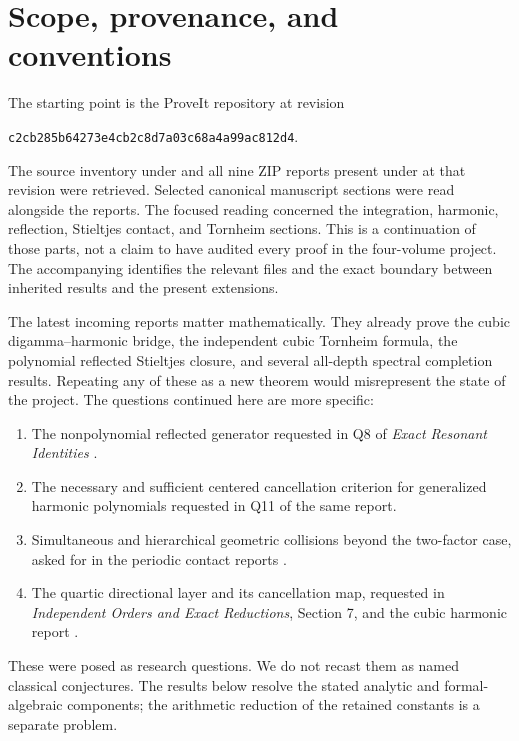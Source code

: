 \section{Scope, provenance, and conventions}
\label{sec:scope}

The starting point is the ProveIt repository at revision
\begin{center}
\texttt{c2cb285b64273e4cb2c8d7a03c68a4a99ac812d4}.
\end{center}
The source inventory under
 and all nine ZIP reports
present under  at that revision were retrieved.
Selected canonical manuscript sections were read alongside the reports.
The focused reading concerned the integration, harmonic, reflection,
Stieltjes contact, and Tornheim sections. This is a continuation of those
parts, not a claim to have audited every proof in the four-volume project.
The accompanying  identifies the relevant files and
the exact boundary between inherited results and the present extensions.

The latest incoming reports matter mathematically. They already prove
the cubic digamma--harmonic bridge, the independent cubic Tornheim
formula, the polynomial reflected Stieltjes closure, and several
all-depth spectral completion results. Repeating any of these as a new
theorem would misrepresent the state of the project. The questions
continued here are more specific:
\begin{enumerate}
\item The nonpolynomial reflected generator requested in Q8 of
\emph{Exact Resonant Identities} \cite{RepoExact}.
\item The necessary and sufficient centered cancellation criterion for
generalized harmonic polynomials requested in Q11 of the same report.
\item Simultaneous and hierarchical geometric collisions beyond the
two-factor case, asked for in the periodic contact reports
\cite{RepoPeriodic,RepoMixed}.
\item The quartic directional layer and its cancellation map, requested
in \emph{Independent Orders and Exact Reductions}, Section 7,
and the cubic harmonic report \cite{RepoIndependent,RepoCubic}.
\end{enumerate}

These were posed as research questions. We do not recast them as named
classical conjectures. The results below resolve the stated analytic and
formal-algebraic components; the arithmetic reduction of the retained
constants is a separate problem.

